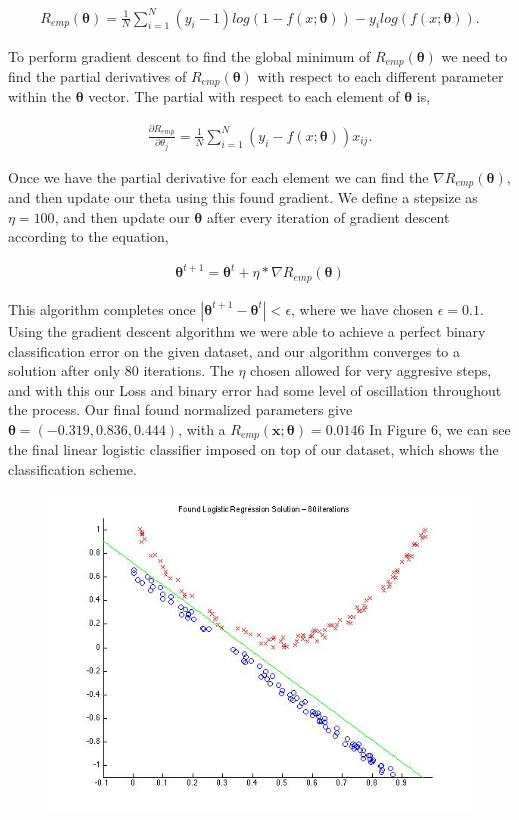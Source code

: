 \documentclass[paper=a4, fontsize=11pt]{scrartcl} %
\numberwithin{equation}{section} %
\numberwithin{figure}{section} %
\numberwithin{table}{section} %
\begin{document}
\begin{align}
R_{emp}(\bm{\theta}) = \frac{1}{N}\sum\limits_{i=1}^N(y_{i}-1)log(1-f(x;\bm{\theta})) - y_{i}log(f(x;\bm{\theta})).
\end{align}

To perform gradient descent to find the global minimum of $R_{emp}(\bm{\theta})$ we need to find the partial derivatives of $R_{emp}(\bm{\theta})$ with respect to each different parameter within the $\bm{\theta}$ vector.  The partial with respect to each element of $\bm{\theta}$ is,

\begin{align}
\frac{\partial R_{emp}}{\partial \theta_{j}} = \frac{1}{N}\sum\limits_{i=1}^N(y_{i}-f(x;\bm{\theta}))x_{ij}.
\end{align}

Once we have the partial derivative for each element we can find the $\nabla R_{emp}(\bm{\theta})$, and then update our theta using this found gradient. 
We define a stepsize as $\eta = 100$, and then update our $\bm{\theta}$ after every iteration of gradient descent according to the equation,

\begin{align}
\bm{\theta} ^{t+1} = \bm{\theta} ^t + \eta*\nabla R_{emp}(\bm{\theta})
\end{align}

This algorithm completes once $| \bm{\theta} ^{t+1} -  \bm{\theta} ^t| < \epsilon$, where we have chosen $\epsilon = 0.1$. 
Using the gradient descent algorithm we were able to achieve a perfect binary classification error on the given dataset, and our algorithm converges to a solution after only 80 iterations.
The $\eta$ chosen allowed for very aggresive steps, and with this our Loss and binary error had some level of oscillation throughout the process.
Our final found normalized parameters give $\bm{\theta}  = (-0.319, 0.836, 0.444)$, with a $R_{emp}(\bm{x};\bm{\theta}) = 0.0146$ 
In Figure 6, we can see the  final linear logistic classifier imposed on top of our dataset, which shows the classification scheme.

\begin{figure}
\centering
\includegraphics[scale=0.4]{prob3sol.jpg}
\end{figure}
\end{document}
